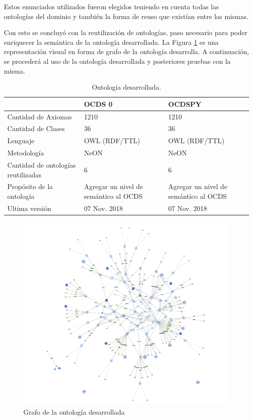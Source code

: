 Estos enunciados utilizados fueron elegidos teniendo en cuenta todas las ontologías del dominio y también la forma de reuso que existían entre las mismas. 

Con esto se concluyó con la reutilización de ontologías, paso necesario para poder enriquecer la semántica de la ontología desarrollada. La Figura \ref{img:grafo ontologia desarrolla} es una representación visual en forma de grafo de la ontología desarrolla. A continuación, se procederá al uso de la ontología desarrollada y posteriores pruebas con la misma.


\begin{table}[!htb]
    \caption{Ontologia desarrollada.}
    \label{tab:comparacion_ontologias}
    
    \scriptsize 
    \begin{tabular}{|L{6cm}|C{2.5cm}}
    \hline
     &  OCDS 0  & OCDSPY \\
    \hline

    
    Cantidad de Axiomas & 1210 & 1210 \\
    \hline

    Cantidad de Clases & 36 & 36 \\
    \hline

    Lenguaje & OWL (RDF/TTL) & OWL (RDF/TTL) \\
    \hline
    Metodología & NeON & NeON \\
     \hline
    Cantidad de ontologías reutilizadas & 6 & 6\\
    \hline
    Propósito de la ontología & Agregar un nivel de semántico al OCDS  & Agregar un nivel de semántico al OCDS \\
    \hline
    Ultima versión & 07 Nov. 2018 & 07 Nov. 2018 \\
    \hline
    \end{tabular}
    
    \bigskip
   
    \end{table}

\begin{figure}[ht!]
    \includegraphics[width=180mm]{figuras/grafoOCDS.png}
    \caption{Grafo de la ontología desarrollada}
    \label{img:grafo ontologia desarrolla}
    \end{figure}